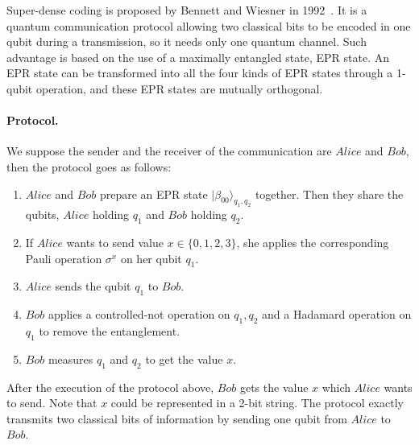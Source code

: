 \documentclass[runningheads]{llncs}
\begin{document}
Super-dense coding is proposed by Bennett and Wiesner in 1992~\cite{BW92}. It is a quantum communication protocol allowing two classical bits to be encoded in one qubit during a transmission, so it needs only one quantum channel. Such advantage is based on the use of a maximally
entangled state, EPR state. An EPR state can be transformed into all the four kinds of EPR states through a 1-qubit operation, and these EPR states are mutually orthogonal. 
\paragraph{Protocol.}
We suppose the sender and the receiver of the communication are $Alice$ and $Bob$, then the protocol goes as follows:
\begin{enumerate}
    \item $Alice$ and $Bob$ prepare an EPR state $|\beta_{00}\rangle_{q_1,q_2}$ together. Then they share the qubits, $Alice$ holding $q_1$ and $Bob$ holding $q_2$.
    \item If $Alice$ wants to send value $x\in \{0,1,2,3\}$, she applies the corresponding Pauli operation $\sigma^{x}$ on her qubit $q_1$.
    \item $Alice$ sends the qubit $q_1$ to $Bob$.
    \item $Bob$ applies a controlled-not operation on $q_1,q_2$ and a Hadamard operation on $q_1$ to remove the entanglement.
    \item $Bob$ measures $q_1$ and $q_2$ to get the value $x$.
\end{enumerate}
After the execution of the protocol above, $Bob$ gets the value $x$ which $Alice$ wants to send. Note that $x$ could be represented in a 2-bit string. The protocol exactly transmits two classical bits of information by sending one qubit from $Alice$ to $Bob$.
\end{document}
